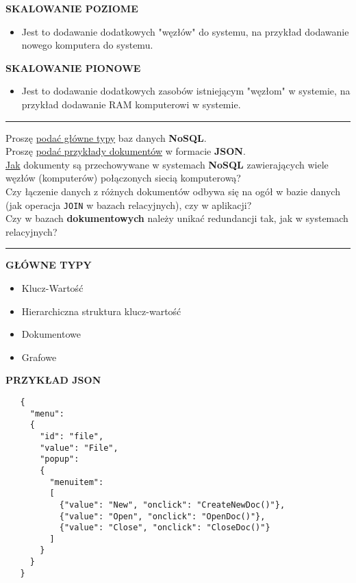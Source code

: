 \documentclass[a5paper,6pt]{article}
\newcommand{\horrule}[1]{\rule{\linewidth}{#1}}
\begin{document}
    \vskip 0.5cm

    \textbf{SKALOWANIE POZIOME}
    \begin{itemize}
        \item Jest to dodawanie dodatkowych "węzłów" do systemu, na przykład
              dodawanie nowego komputera do systemu.
    \end{itemize}

    \textbf{SKALOWANIE PIONOWE}
    \begin{itemize}
        \item Jest to dodawanie dodatkowych zasobów istniejącym "węzłom" w
        systemie, na przykład dodawanie RAM komputerowi w systemie.
    \end{itemize}

    \horrule{0.5pt}
    Proszę \underline{podać główne typy} baz danych \textbf{NoSQL}.\\
    Proszę \underline{podać przykłady dokumentów} w formacie \textbf{JSON}.\\
    \underline{Jak} dokumenty są przechowywane w systemach \textbf{NoSQL}
    zawierających wiele węzłów (komputerów) połączonych siecią komputerową?\\
    Czy łączenie danych z różnych dokumentów odbywa się na ogół w bazie danych
    (jak operacja \texttt{JOIN} w bazach relacyjnych), czy w aplikacji?\\
    Czy w bazach \textbf{dokumentowych} należy unikać redundancji tak, jak w
    systemach relacyjnych?\\
    \horrule{0.5pt}

    \vskip 0.5cm

    \textbf{GŁÓWNE TYPY}
    \begin{itemize}
        \item Klucz-Wartość
        \item Hierarchiczna struktura klucz-wartość
        \item Dokumentowe
        \item Grafowe
    \end{itemize}

\pagebreak

    \textbf{PRZYKŁAD JSON}
    \begin{verbatim}
   {
     "menu":
     {
       "id": "file",
       "value": "File",
       "popup":
       {
         "menuitem":
         [
           {"value": "New", "onclick": "CreateNewDoc()"},
           {"value": "Open", "onclick": "OpenDoc()"},
           {"value": "Close", "onclick": "CloseDoc()"}
         ]
       }
     }
   }
    \end{verbatim}
\end{document}
